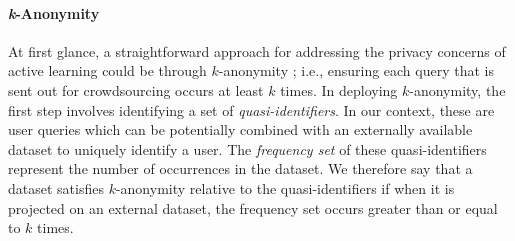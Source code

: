 \documentclass[letterpaper]{article}
\begin{document}
\paragraph{\textit{k}-Anonymity} 
At first glance, a straightforward approach for addressing the privacy concerns of active learning could be through $k$-anonymity \cite{sweeney2002k,di2016enforcing}; i.e., ensuring each query that is sent out for crowdsourcing occurs at least $k$ times. In deploying $k$-anonymity, the first step involves identifying a set of \textit{quasi-identifiers}. In our context, these are user queries which can be potentially combined with an externally available dataset to uniquely identify a user. The \textit{frequency set} of these quasi-identifiers represent the number of occurrences in the dataset. We therefore say that a dataset satisfies $k$-anonymity relative to the quasi-identifiers if when it is projected on an external dataset, the frequency set occurs greater than or equal to $k$ times. 
\end{document}
